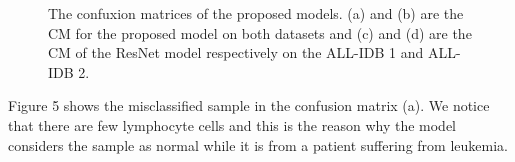 \documentclass[diagnostics,article,submit,pdftex,moreauthors]{Definitions/mdpi}
\begin{document}
\begin{figure}[!h]
  \centering
  \quad 
  \quad  
  \quad 
  \quad  
  \caption{ The confuxion matrices of the proposed models. (a) and (b) are the CM for the proposed model on both datasets and (c) and (d) are the CM of the ResNet model respectively on the ALL-IDB 1 and ALL-IDB 2. }
\end{figure}

\newpage

Figure 5 shows the misclassified sample in the confusion matrix (a). We notice that there are few lymphocyte cells and this is the reason why the model considers the sample as normal while it is from a patient suffering from leukemia.
\end{document}
